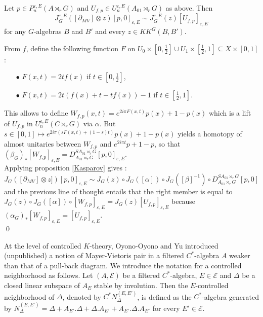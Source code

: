 \begin{lem}
Let $p\in P_n^{\varepsilon,E}(A\rtimes_r G)$ and $U_{f,p}\in U_n^{\varepsilon,E}(A_{01}\rtimes_r G)$ as above. Then
\[J^{\varepsilon, E}_G([\partial_{MV}]\otimes z ) [p,0]_{\varepsilon, E} \sim J^{\varepsilon, E}_G(z)[U_{f,p}]_{\varepsilon, E}\]
for any $G$-algebras $B$ and $B'$ and every $z\in KK^G(B,B')$.
\end{lem}

\begin{dem}
From $f$, define the following function $F$ on $U_0\times[0,\frac{1}{2}]\cup U_1\times [\frac{1}{2},1]\subseteq X\times[0,1]$: 
\begin{itemize}
\item[$\bullet$] $F(x,t)= 2t f(x)$ if $t\in [0,\frac{1}{2}]$,
\item[$\bullet$] $F(x,t)= 2t (f(x)+t-tf(x))-1$ if $t\in [\frac{1}{2},1]$.
\end{itemize} 
This allows to define $W_{f,p}(x,t)=e^{2i\pi F(x,t)}p(x)+1-p(x)$ which is a lift of $U_{f,p}$ in $U_n^{\varepsilon,E}( C \rtimes_r G)$ via $\alpha$.
But $s\in [0,1]\mapsto e^{2i\pi (sF(x,t)+(1-s)t)}p(x)+1-p(x)$ yields a homotopy of almost unitaries between $W_{f,p}$ and $e^{2i\pi t}p + 1-p$, so that $(\beta_G)_*[W_{f,p}]_{\varepsilon,E}=D_{A_{01}\rtimes_r G}^{SA_{01}\rtimes_r G} [p,0]_{\varepsilon,E}$.\\

Applying proposition \ref{Kasparov} gives : 
\[J_G([\partial_{MV}]\otimes z])[p,0]_{\varepsilon,E} \sim J_G(z)\circ J_G([\alpha])\circ J_G([\beta]^{-1}) \circ D_{A_{01}\rtimes_r G}^{SA_{01}\rtimes_r G} [p,0]  \]
and the previous line of thought entails that the right member is equal to $J_G(z)\circ J_G([\alpha]) \circ [W_{f,p}]_{\varepsilon,E} = J_G(z)[U_{f,p}]_{\varepsilon,E} $ because $(\alpha_G)_* [W_{f,p}]_{\varepsilon,E}=[U_{f,p}]_{\varepsilon,E} $.\\
\qed
\end{dem}

At the level of controlled $K$-theory, Oyono-Oyono and Yu introduced (unpublished) a notion of Mayer-Vietoris pair in a filtered $C^*$-algebra $A$ weaker than that of a pull-back diagram. We introduce the notation for a controlled neighborhood as follows. Let $(A,\mathcal E)$ be a filtered $C^*$-algebra, $E\in\mathcal E$ and $\Delta$ be a closed linear subspace of $A_E$ stable by involution. Then the $E$-controlled neighborhood of $\Delta$, denoted by $C^* N_{\Delta}^{(E,E')}$, is defined as the $C^*$-algebra generated by $N_{\Delta}^{(E,E')} = \Delta + A_{E'}.\Delta +\Delta. A_{E'} + A_{E'}.\Delta.A_{E'} $ for every $E'\in\mathcal E$.

